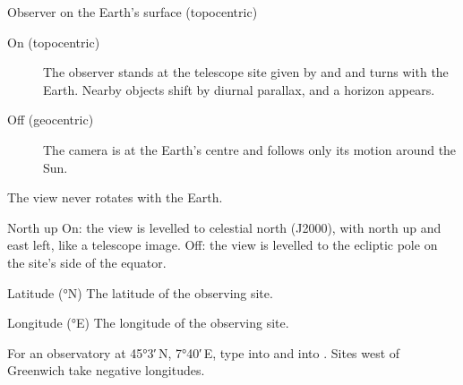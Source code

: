 \begin{uipanel}
\begin{uiproperty}[key=topocentric, id=ObserverTopocentricCheckBox, type={check box},
    default={off (geocentric)}, effect=camera, saved=file,
    help=Tabs_Settings_HelpObserverTopocentric]{Observer on the Earth's surface (topocentric)}
\begin{description}
  \item[On (topocentric)] The observer stands at the telescope site given by
     and  and turns with the Earth. Nearby
    objects shift by diurnal parallax, and a horizon appears.
  \item[Off (geocentric)] The camera is at the Earth's centre and follows only its motion
    around the Sun.
\end{description}
The view never rotates with the Earth.
\end{uiproperty}

\begin{uiproperty}[key=north-up, id=ObserverNorthUpCheckBox, type={check box}, default={on},
    effect=camera, saved=file, help=Tabs_Settings_HelpObserverNorthUp]{North up}
On: the view is levelled to celestial north (J2000), with north up and east left, like a
telescope image. Off: the view is levelled to the ecliptic pole on the site's side of the
equator.
\end{uiproperty}

\begin{uiproperty}[key=latitude, id=ObserverLatSlider, type={slider}, unit={\unit{\degree}, positive north},
    range={\qty{-90}{\degree} to \qty{90}{\degree}, step \qty{0.1}{\degree}},
    default={\qty{0}{\degree}}, effect=camera, saved=file, visible={topocentric on},
    help=Tabs_Settings_HelpObserverLatitude]{Latitude (°N)}
The latitude of the observing site.
\end{uiproperty}

\begin{uiproperty}[key=longitude, id=ObserverLonSlider, type={slider}, unit={\unit{\degree}, positive east of Greenwich},
    range={\qty{-180}{\degree} to \qty{180}{\degree}, step \qty{0.1}{\degree}},
    default={\qty{0}{\degree}}, effect=camera, saved=file, visible={topocentric on},
    help=Tabs_Settings_HelpObserverLongitude]{Longitude (°E)}
The longitude of the observing site.
\begin{uiexample}
For an observatory at \ang{45;3;}\,N, \ang{7;40;}\,E, type  into
 and  into . Sites west of
Greenwich take negative longitudes.
\end{uiexample}
\end{uiproperty}


\end{uipanel}

